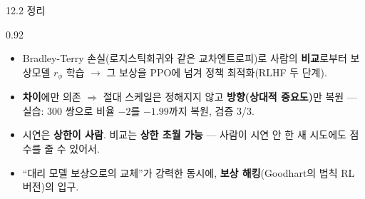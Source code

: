 \begin{frame}{12.2 정리}
\begin{center}\begin{varwidth}{0.92\textwidth}
  \begin{itemize}
    \item Bradley-Terry 손실(로지스틱회귀와 같은 교차엔트로피)로
      사람의 \textbf{비교}로부터 보상모델 $r_\phi$ 학습 $\to$
      그 보상을 PPO에 넘겨 정책 최적화(RLHF 두 단계).
    \item \textbf{차이}에만 의존 $\Rightarrow$ 절대 스케일은
      정해지지 않고 \textbf{방향(상대적 중요도)}만 복원 — 실습:
      300 쌍으로 비율 $-2$를 $-1.99$까지 복원, 검증 3/3.
    \item 시연은 \textbf{상한이 사람}. 비교는 \textbf{상한 초월
      가능} — 사람이 시연 안 한 새 시도에도 점수를 줄 수 있어서.
    \item ``대리 모델 보상으로의 교체''가 강력한 동시에,
      \textbf{보상 해킹}(Goodhart의 법칙 RL 버전)의 입구.
  \end{itemize}
\end{varwidth}\end{center}
\end{frame}
